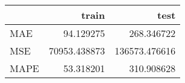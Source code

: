 \begin{tabular}{lrr}
\toprule
{} &         train &           test \\
\midrule
MAE  &     94.129275 &     268.346722 \\
MSE  &  70953.438873 &  136573.476616 \\
MAPE &     53.318201 &     310.908628 \\
\bottomrule
\end{tabular}
